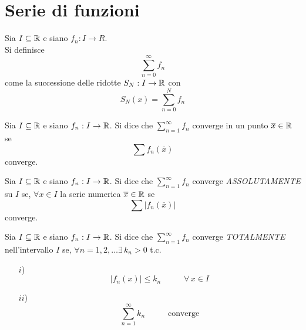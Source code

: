 \section{Serie di funzioni}

\begin{definition}
    Sia $I \subseteq \mathbb{R}$ e siano $f_n: I \to R$.\\
    Si definisce 
    \begin{equation}
        \sum_{n=0}^\infty f_n
    \end{equation}
    come la successione delle ridotte $S_N : I \to \mathbb{R}$ con
    \begin{equation}
        S_N(x) = \sum_{n=0}^N f_n
    \end{equation}
\end{definition}

\begin{definition}
    Sia $I \subseteq \mathbb{R}$ e siano $f_n : I \to \mathbb{R}$.
    Si dice che $\sum_{n=1}^\infty f_n$ converge in un punto $\overline{x} \in \mathbb{R}$ se \[\sum f_n(\overline{x})\] converge.
\end{definition}


\begin{definition}
    Sia $I \subseteq \mathbb{R}$ e siano $f_n : I \to \mathbb{R}$.
    Si dice che $\sum_{n=1}^\infty f_n$ converge \emph{ASSOLUTAMENTE} su $I$ se, $\forall x \in I$ la serie numerica $\overline{x} \in \mathbb{R}$ se \[\sum |f_n(\overline{x})|\] converge.
\end{definition}

\begin{definition}
    Sia $I \subseteq \mathbb{R}$ e siano $f_n : I \to \mathbb{R}$.
    Si dice che $\sum_{n=1}^\infty f_n$ converge \emph{TOTALMENTE} nell'intervallo $I$ se, $\forall n = 1, 2, \dotsc \exists\, k_n > 0$ t.c.
    \begin{itemize}
        \item [$i$)] \[ |f_n(x)| \leq k_n \mspace{50mu} \forall\, x \in I\]
        \item [$ii$)] \[ \sum_{n=1}^\infty k_n \mspace{50mu} \mbox{converge} \] 
    \end{itemize}
\end{definition}

